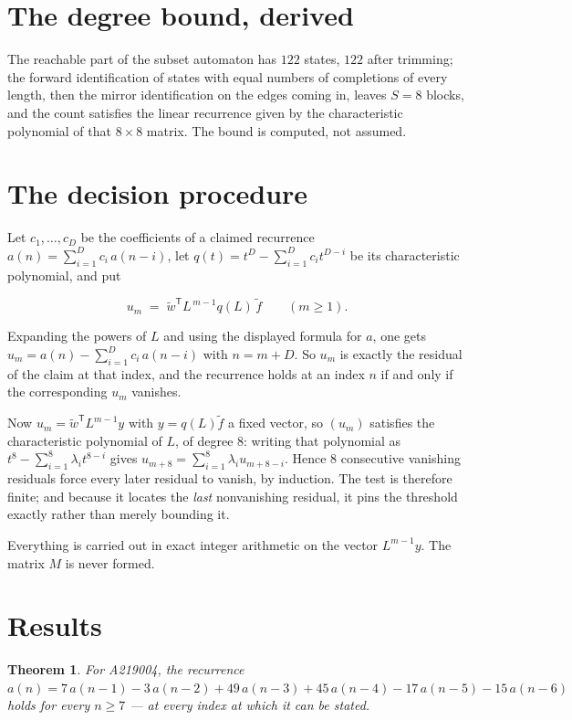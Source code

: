 \documentclass[11pt]{article}
\newtheorem{theorem}{Theorem}
\theoremstyle{definition}
\begin{document}
\section{The degree bound, derived}

The reachable part of the subset automaton has $122$ states, $122$ after trimming; the forward identification of states with equal numbers of completions of every length, then the mirror identification on the edges coming in, leaves $S = 8$ blocks, and the count satisfies the linear recurrence given by the characteristic polynomial of that $8\times8$ matrix. The bound is computed, not assumed.

\section{The decision procedure}

Let $c_1,\dots,c_D$ be the coefficients of a claimed recurrence $a(n) = \sum_{i=1}^{D} c_i\,a(n-i)$, let $q(t) = t^{D} - \sum_{i=1}^{D} c_i t^{D-i}$ be its characteristic polynomial, and put

\[u_m \;=\; \tilde w^{\mathsf T} L^{\,m-1} q(L)\,\tilde f \qquad (m \ge 1).\]

Expanding the powers of $L$ and using the displayed formula for $a$, one gets $u_m = a(n) - \sum_{i=1}^{D} c_i\,a(n-i)$ with $n = m + D$. So $u_m$ is exactly the residual of the claim at that index, and the recurrence holds at an index $n$ if and only if the corresponding $u_m$ vanishes.

Now $u_m = \tilde w^{\mathsf T} L^{m-1} y$ with $y = q(L)\tilde f$ a fixed vector, so $(u_m)$ satisfies the characteristic polynomial of $L$, of degree $8$: writing that polynomial as $t^{8} - \sum_{i=1}^{8} \lambda_i t^{8-i}$ gives $u_{m+8} = \sum_{i=1}^{8} \lambda_i u_{m+8-i}$. Hence $8$ consecutive vanishing residuals force every later residual to vanish, by induction. The test is therefore finite; and because it locates the {\itshape last} nonvanishing residual, it pins the threshold exactly rather than merely bounding it.

Everything is carried out in exact integer arithmetic on the vector $L^{m-1}y$. The matrix $M$ is never formed.

\section{Results}

\begin{theorem} For A219004, the recurrence $a(n) = 7\,a(n-1) - 3\,a(n-2) + 49\,a(n-3) + 45\,a(n-4) - 17\,a(n-5) - 15\,a(n-6)$ holds for every $n \ge 7$ --- at every index at which it can be stated.\end{theorem}
\end{document}

